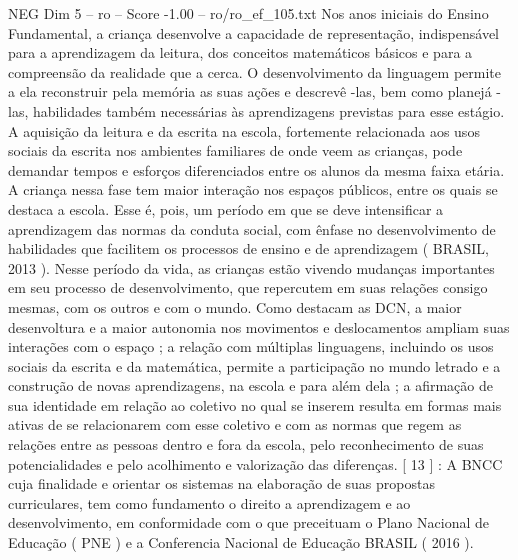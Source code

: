 \begin{textsample}{NEG Dim 5 – ro – Score -1.00 – ro/ro\_ef\_105.txt}
Nos anos iniciais do Ensino Fundamental, a criança desenvolve a capacidade de representação, indispensável para a aprendizagem da leitura, dos conceitos matemáticos básicos e para a compreensão da realidade que a cerca.
O desenvolvimento da linguagem permite a ela reconstruir pela memória as suas ações e descrevê -las, bem como planejá -las, habilidades também necessárias às aprendizagens previstas para esse estágio.
A aquisição da leitura e da escrita na escola, fortemente relacionada aos usos sociais da escrita nos ambientes familiares de onde veem as crianças, pode demandar tempos e esforços diferenciados entre os alunos da mesma faixa etária.
A criança nessa fase tem maior interação nos espaços públicos, entre os quais se destaca a escola.
Esse é, pois, um período em que se deve intensificar a aprendizagem das normas da conduta social, com ênfase no desenvolvimento de habilidades que facilitem os processos de ensino e de aprendizagem ( BRASIL, 2013 ).
Nesse período da vida, as crianças estão vivendo mudanças importantes em seu processo de desenvolvimento, que repercutem em suas relações consigo mesmas, com os outros e com o mundo.
Como destacam as DCN, a maior desenvoltura e a maior autonomia nos movimentos e deslocamentos ampliam suas interações com o espaço ; a relação com múltiplas linguagens, incluindo os usos sociais da escrita e da matemática, permite a participação no mundo letrado e a construção de novas aprendizagens, na escola e para além dela ; a afirmação de sua identidade em relação ao coletivo no qual se inserem resulta em formas mais ativas de se relacionarem com esse coletivo e com as normas que regem as relações entre as pessoas dentro e fora da escola, pelo reconhecimento de suas potencialidades e pelo acolhimento e valorização das diferenças. [ 13 ] : A BNCC cuja finalidade e orientar os sistemas na elaboração de suas propostas curriculares, tem como fundamento o direito a aprendizagem e ao desenvolvimento, em conformidade com o que preceituam o Plano Nacional de Educação ( PNE ) e a Conferencia Nacional de Educação BRASIL ( 2016 ).

\end{textsample}
